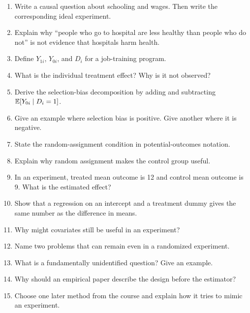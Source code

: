\begin{enumerate}
    \item Write a causal question about schooling and wages. Then write the
    corresponding ideal experiment.
    \item Explain why ``people who go to hospital are less healthy than people
    who do not'' is not evidence that hospitals harm health.
    \item Define \(Y_{1i}\), \(Y_{0i}\), and \(D_i\) for a job-training program.
    \item What is the individual treatment effect? Why is it not observed?
    \item Derive the selection-bias decomposition by adding and subtracting
    \(\mathbb{E}[Y_{0i}\mid D_i=1]\).
    \item Give an example where selection bias is positive. Give another where
    it is negative.
    \item State the random-assignment condition in potential-outcomes notation.
    \item Explain why random assignment makes the control group useful.
    \item In an experiment, treated mean outcome is 12 and control mean outcome
    is 9. What is the estimated effect?
    \item Show that a regression on an intercept and a treatment dummy gives the
    same number as the difference in means.
    \item Why might covariates still be useful in an experiment?
    \item Name two problems that can remain even in a randomized experiment.
    \item What is a fundamentally unidentified question? Give an example.
    \item Why should an empirical paper describe the design before the
    estimator?
    \item Choose one later method from the course and explain how it tries to
    mimic an experiment.
\end{enumerate}


